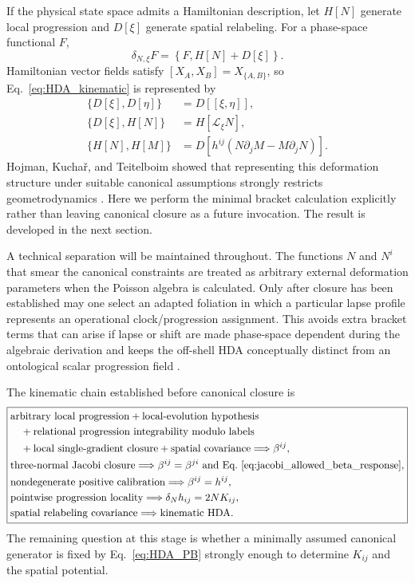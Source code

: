\documentclass[11pt]{article}
\begin{document}
If the physical state space admits a Hamiltonian description, let $H[N]$ generate local progression and $D[\xi]$ generate spatial relabeling. For a phase-space functional $F$,
\begin{equation}
    \delta_{N,\xi}F
    =\left\{F,H[N]+D[\xi]\right\}.
\end{equation}
Hamiltonian vector fields satisfy $[X_A,X_B]=X_{\{A,B\}}$, so Eq.~\eqref{eq:HDA_kinematic} is represented by
\begin{equation}
\boxed{
\begin{aligned}
\{D[\xi],D[\eta]\}
&=D[[\xi,\eta]],\\
\{D[\xi],H[N]\}
&=H[\mathcal L_\xi N],\\
\{H[N],H[M]\}
&=D[h^{ij}(N\partial_jM-M\partial_jN)].
\end{aligned}}
\label{eq:HDA_PB}
\end{equation}
Hojman, Kucha\v{r}, and Teitelboim showed that representing this deformation structure under suitable canonical assumptions strongly restricts geometrodynamics \cite{HKT1976}. Here we perform the minimal bracket calculation explicitly rather than leaving canonical closure as a future invocation. The result is developed in the next section.

A technical separation will be maintained throughout. The functions $N$ and $N^i$ that smear the canonical constraints are treated as arbitrary external deformation parameters when the Poisson algebra is calculated. Only after closure has been established may one select an adapted foliation in which a particular lapse profile represents an operational clock/progression assignment. This avoids extra bracket terms that can arise if lapse or shift are made phase-space dependent during the algebraic derivation and keeps the off-shell HDA conceptually distinct from an ontological scalar progression field \cite{Thiemann2024,Bojowald2025}.

The kinematic chain established before canonical closure is
\begin{equation}
\boxed{
\begin{aligned}
&\text{arbitrary local progression}
+\text{local-evolution hypothesis}\\
&\quad+\text{relational progression integrability modulo labels}\\
&\quad+\text{local single-gradient closure}
+\text{spatial covariance}
\Longrightarrow \beta^{ij},\\
&\text{three-normal Jacobi closure}
\Longrightarrow \beta^{ij}=\beta^{ji}
\text{ and Eq.~\eqref{eq:jacobi_allowed_beta_response}},\\
&\text{nondegenerate positive calibration}
\Longrightarrow \beta^{ij}=h^{ij},\\
&\text{pointwise progression locality}
\Longrightarrow \delta_Nh_{ij}=2NK_{ij},\\
&\text{spatial relabeling covariance}
\Longrightarrow \text{kinematic HDA}.
\end{aligned}}
\label{eq:path_to_HDA}
\end{equation}
The remaining question at this stage is whether a minimally assumed canonical generator is fixed by Eq.~\eqref{eq:HDA_PB} strongly enough to determine $K_{ij}$ and the spatial potential.
\end{document}
